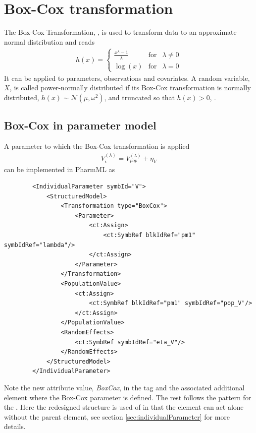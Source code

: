 \section{Box-Cox transformation}
\label{sec:BoxCoxTrafo}
The Box-Cox Transformation, \cite{BoxCox:1964}, is used to transform data to an approximate normal distribution
and reads
\begin{align}
h(x) = \left\{ \begin{array}{rcl}  \frac{x^{\lambda} -1}{\lambda} & \mbox{for} & \lambda \neq 0 \\  \log(x) & \mbox{for} & \lambda = 0 \end{array}\right. \nonumber
\end{align}
It can be applied to parameters, observations and covariates. 
A random variable, $X$, is called power-normally distributed if its 
Box-Cox transformation is normally distributed, $h(x) \sim \mathcal {N} (\mu,\omega^2)$, 
and truncated so that $h(x) > 0$, \cite{LavielleBook:2014}.

\subsection{Box-Cox in parameter model}
A parameter to which the Box-Cox transformation is applied 
\begin{align*}
        V_{i}^{(\lambda)} = V_{pop}^{(\lambda)} + \eta_V
\end{align*}
can be implemented in PharmML as
\lstset{language=XML}
\begin{lstlisting}
        <IndividualParameter symbId="V">
            <StructuredModel>
                <Transformation type="BoxCox">
                    <Parameter>
                        <ct:Assign>
                            <ct:SymbRef blkIdRef="pm1" symbIdRef="lambda"/>
                        </ct:Assign>
                    </Parameter>
                </Transformation>
                <PopulationValue>
                    <ct:Assign>
                        <ct:SymbRef blkIdRef="pm1" symbIdRef="pop_V"/>
                    </ct:Assign>
                </PopulationValue>
                <RandomEffects>
                    <ct:SymbRef symbIdRef="eta_V"/>
                </RandomEffects>
            </StructuredModel>
        </IndividualParameter>
 \end{lstlisting}
Note the new  attribute value, \emph{BoxCox}, in the  
tag and the associated additional element  where the Box-Cox 
parameter is defined. The rest follows the pattern for the .
Here the redesigned structure is used of  in that the 
 element can act alone without the  
parent element, see section \ref{sec:individualParameter}
for more details.

